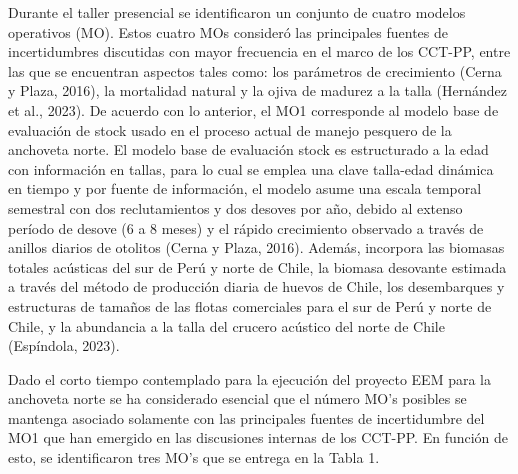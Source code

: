 
Durante el taller presencial se identificaron un conjunto de cuatro modelos operativos (MO). Estos cuatro MOs consideró las principales fuentes de incertidumbres discutidas con mayor frecuencia en el marco de los CCT-PP, entre las que se encuentran aspectos tales como: los parámetros de crecimiento (Cerna y Plaza, 2016), la mortalidad natural y la ojiva de madurez a la talla (Hernández et al., 2023). De acuerdo con lo anterior, el MO1 corresponde al modelo base de evaluación de stock usado en el proceso actual de manejo pesquero de la anchoveta norte. El modelo base de evaluación stock es estructurado a la edad con información en tallas, para lo cual se emplea una clave talla-edad dinámica en tiempo y por fuente de información, el modelo asume una escala temporal semestral con dos reclutamientos y dos desoves por año, debido al extenso período de desove (6 a 8 meses) y el rápido crecimiento observado a través de anillos diarios de otolitos (Cerna y Plaza, 2016). Además, incorpora las biomasas totales acústicas del sur de Perú y norte de Chile, la biomasa desovante estimada a través del método de producción diaria de huevos de Chile, los desembarques y estructuras de tamaños de las flotas comerciales para el sur de Perú y norte de Chile, y la abundancia a la talla del crucero acústico del norte de Chile (Espíndola, 2023).
\newline{}

Dado el corto tiempo contemplado para la ejecución del proyecto EEM para la anchoveta norte se ha considerado esencial que el número MO’s posibles se mantenga asociado solamente con las principales fuentes de incertidumbre del MO1 que han emergido en las discusiones internas de los CCT-PP. En función de esto, se identificaron tres MO’s que se entrega en la Tabla 1.

